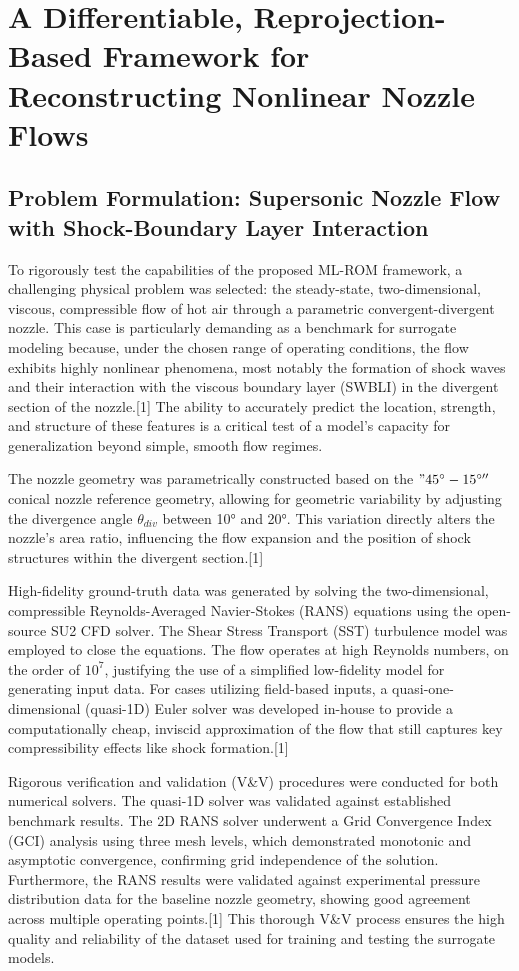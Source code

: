 \documentclass[12pt, a4paper]{report}
\begin{document}
\chapter{A Differentiable, Reprojection-Based Framework for Reconstructing Nonlinear Nozzle Flows}

\section{Problem Formulation: Supersonic Nozzle Flow with Shock-Boundary Layer Interaction}

To rigorously test the capabilities of the proposed ML-ROM framework, a challenging physical problem was selected: the steady-state, two-dimensional, viscous, compressible flow of hot air through a parametric convergent-divergent nozzle. This case is particularly demanding as a benchmark for surrogate modeling because, under the chosen range of operating conditions, the flow exhibits highly nonlinear phenomena, most notably the formation of shock waves and their interaction with the viscous boundary layer (SWBLI) in the divergent section of the nozzle.[1] The ability to accurately predict the location, strength, and structure of these features is a critical test of a model's capacity for generalization beyond simple, smooth flow regimes.

The nozzle geometry was parametrically constructed based on the $"45^{\circ}-15^{\circ\prime\prime}$ conical nozzle reference geometry, allowing for geometric variability by adjusting the divergence angle $\theta_{div}$ between \ang{10} and \ang{20}. This variation directly alters the nozzle's area ratio, influencing the flow expansion and the position of shock structures within the divergent section.[1]

High-fidelity ground-truth data was generated by solving the two-dimensional, compressible Reynolds-Averaged Navier-Stokes (RANS) equations using the open-source SU2 CFD solver. The Shear Stress Transport (SST) turbulence model was employed to close the equations. The flow operates at high Reynolds numbers, on the order of $10^7$, justifying the use of a simplified low-fidelity model for generating input data. For cases utilizing field-based inputs, a quasi-one-dimensional (quasi-1D) Euler solver was developed in-house to provide a computationally cheap, inviscid approximation of the flow that still captures key compressibility effects like shock formation.[1]

Rigorous verification and validation (V\&V) procedures were conducted for both numerical solvers. The quasi-1D solver was validated against established benchmark results. The 2D RANS solver underwent a Grid Convergence Index (GCI) analysis using three mesh levels, which demonstrated monotonic and asymptotic convergence, confirming grid independence of the solution. Furthermore, the RANS results were validated against experimental pressure distribution data for the baseline nozzle geometry, showing good agreement across multiple operating points.[1] This thorough V\&V process ensures the high quality and reliability of the dataset used for training and testing the surrogate models.
\end{document}
